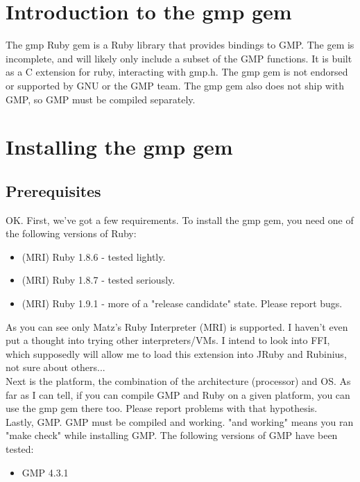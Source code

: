 \documentclass[pdftex,10pt]{article}
\begin{document}
\section{Introduction to the gmp gem}

The gmp Ruby gem is a Ruby library that provides bindings to GMP. The gem is
incomplete, and will likely only include a subset of the GMP functions. It is
built as a C extension for ruby, interacting with gmp.h. The gmp gem is not
endorsed or supported by GNU or the GMP team. The gmp gem also does not ship
with GMP, so GMP must be compiled separately.

\section{Installing the gmp gem}

\subsection{Prerequisites}
OK. First, we've got a few requirements. To install the gmp gem, you need one
of the following versions of Ruby:
\begin{itemize}
  \item (MRI) Ruby 1.8.6 - tested lightly.
  \item (MRI) Ruby 1.8.7 - tested seriously.
  \item (MRI) Ruby 1.9.1 - more of a "release candidate" state. Please report
    bugs.
\end{itemize}
As you can see only Matz's Ruby Interpreter (MRI) is supported. I haven't even
put a thought into trying other interpreters/VMs. I intend to look into FFI,
which supposedly will allow me to load this extension into JRuby and Rubinius,
not sure about others...\\

Next is the platform, the combination of the architecture (processor) and OS.
As far as I can tell, if you can compile GMP and Ruby on a given platform, you
can use the gmp gem there too. Please report problems with that hypothesis.\\

Lastly, GMP. GMP must be compiled and working. "and working" means you ran "make check" while installing GMP. The following versions of GMP have been tested:
\begin{itemize}
  \item GMP 4.3.1
\end{itemize}
\end{document}
